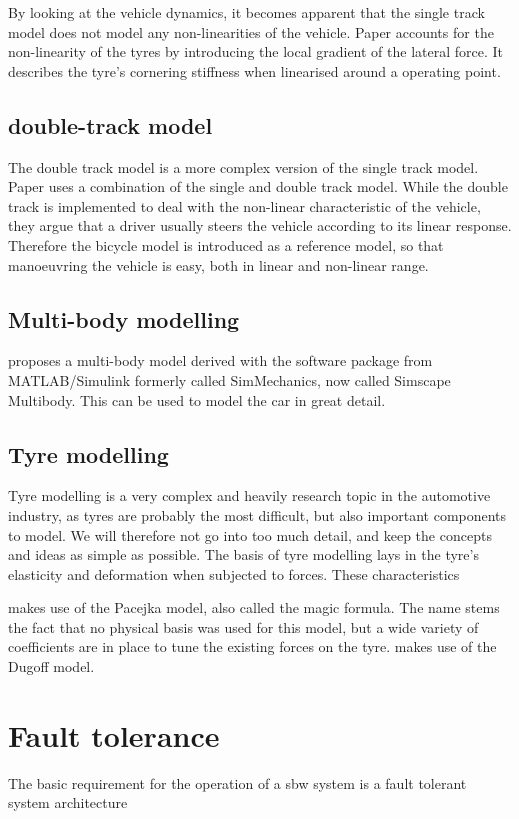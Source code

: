 \documentclass[conference]{IEEEtran}
\begin{document}
By looking at the vehicle dynamics, it becomes apparent that the single track model does not model any non-linearities of the vehicle. Paper \cite{vandersande} accounts for the non-linearity of the tyres by introducing the local gradient of the lateral force. It describes the tyre's cornering stiffness when linearised around a operating point.


\subsection{double-track model}
The double track model is a more complex version of the single track model. 
Paper \cite{Song} uses a combination of the single and double track model. While the double track is implemented to deal with the non-linear characteristic of the vehicle, they argue that a driver usually steers the vehicle according to its linear response. Therefore the bicycle model is introduced as a reference model, so that manoeuvring the vehicle is easy, both in linear and non-linear range.

\subsection{Multi-body modelling}

\cite{vandersande} proposes a multi-body model derived with the software package from MATLAB/Simulink formerly called SimMechanics, now called Simscape Multibody. This can be used to model the car in great detail. 

\subsection{Tyre modelling}

Tyre modelling is a very complex and heavily research topic in the automotive industry, as tyres are probably the most difficult, but also important components to model. We will therefore not go into too much detail, and keep the concepts and ideas as simple as possible.
The basis of tyre modelling lays in the tyre's elasticity and deformation when subjected to forces. These characteristics 

\cite{Se-Wook} makes use of the Pacejka model, also called the magic formula. The name stems the fact that no physical basis was used for this model, but a wide variety of coefficients are in place to tune the existing forces on the tyre.
\cite{Weidong} makes use of the Dugoff model.

\section{Fault tolerance}
The basic requirement for the operation of a sbw system is a fault tolerant system architecture %
\end{document}
